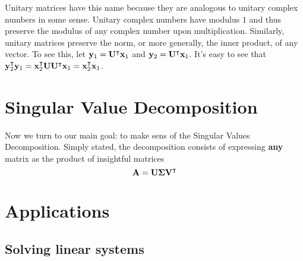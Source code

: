 \documentclass{article}
\begin{document}
 Unitary matrices have this name because they are analogous to unitary complex numbers in some sense. Unitary complex numbers have modulus $1$ and thus preserve the modulus of any complex number upon multiplication. Similarly, unitary matrices preserve the norm, or more generally, the inner product, of any vector. To see this, let $\vb{y}_1 = \vb{U}^\intercal \vb{x}_1$ and $\vb{y}_2 = \vb{U}^\intercal \vb{x}_1$. It's easy to see that $\vb{y}_2^\intercal \vb{y}_1 = \vb{x}_2^\intercal \vb{U} \vb{U}^\intercal \vb{x}_1 = \vb{x}_2^\intercal\vb{x}_1$.

\section{Singular Value Decomposition}

Now we turn to our main goal: to make sens of the Singular Values Decomposition. Simply stated, the decomposition consists of expressing \textbf{any} matrix as the product of insightful matrices
\begin{equation}
    \vb{A}=\vb{U}\boldsymbol{\Sigma}\vb{V}^\intercal
\end{equation}
\section{Applications}
\subsection{Solving linear systems}
\end{document}
